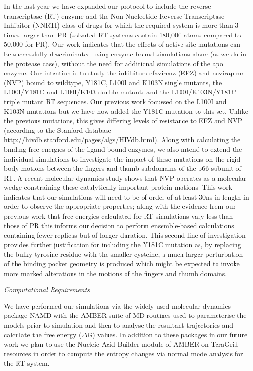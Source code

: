 \begin{compactenum}[a)]
In the last year we have expanded our protocol to include the reverse transcriptase (RT) enzyme and the Non-Nucleotide Reverse Transcriptase Inhibitor (NNRTI) class of drugs for which the required system is more than 3 times larger than PR (solvated RT systems contain 180,000 atoms compared to 50,000 for PR). Our work indicates that the effects of active site mutations can be successfully descriminated using enzyme bound simulations alone (as we do in the protease case), without the need for additional simulations of the apo enzyme. Our intention is to study the inhibitors efavirenz (EFZ) and nevirapine (NVP) bound to wildtype, Y181C, L100I and K103N single mutants, the L100I/Y181C and L100I/K103 double mutants and the L100I/K103N/Y181C triple mutant RT sequences. Our previous work focussed on the L100I and K103N mutations but we have now added the Y181C mutation to this set. Unlike the previous mutations, this gives differing levels of resistance to EFZ and NVP (according to the Stanford database - http://hivdb.stanford.edu/pages/algs/HIVdb.html). Along with calculating the binding free energies of the ligand-bound enzymes, we also intend to extend the individual simulations to investigate the impact of these mutations on the rigid body motions between the fingers and thumb subdomains of the p66 subunit of RT. A recent molecular dynamics study shows that NVP operates as a molecular wedge constraining these catalytically important protein motions\cite{Ivetac2009}. This work indicates that our simulations will need to be of order of at least 30ns in length in order to observe the appropriate properties; along with the evidence from our previous work that free energies calculated for RT simulations vary less than those of PR this informs our decision to perform ensemble-based calculations containing fewer replicas but of longer duration. This second line of investigation provides further justification for including the Y181C mutation as, by replacing the bulky tyrosine residue with the smaller cysteine, a much larger perturbation of the binding pocket geometry is produced which might be expected to invoke more marked alterations in the motions of the fingers and thumb domains.

\item \emph{Computational Requirements} 

We have performed our simulations via the widely used molecular dynamics package NAMD \cite{Phillips2005} with the AMBER \cite{Case2005} suite of MD routines used to parameterise the models prior to simulation and then to analyse the resultant trajectories and calculate the free energy ($\Delta$G) values. In addition to these packages in our future work we plan to use the Nucleic Acid Builder module of AMBER on TeraGrid resources in order to compute the entropy changes via normal mode analysis for the RT system.


\end{compactenum}

